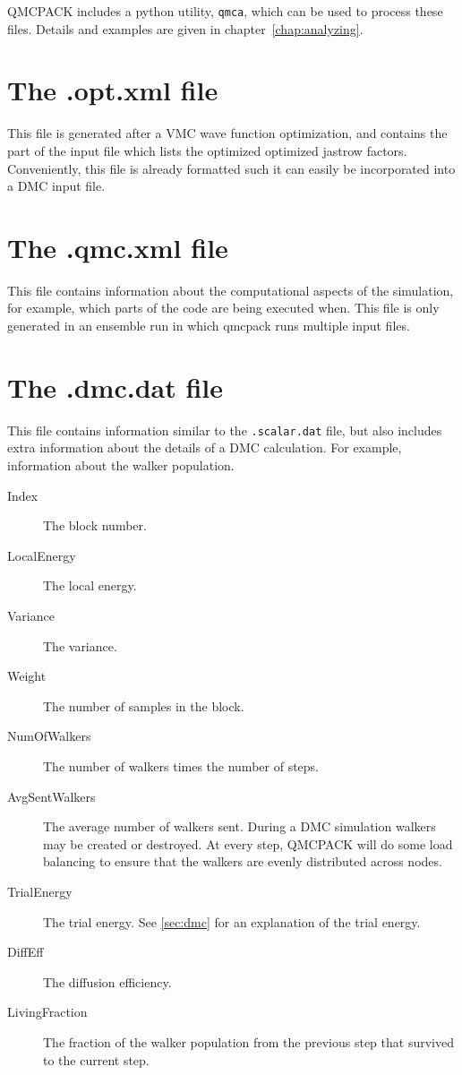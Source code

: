 QMCPACK includes a python utility, \texttt{qmca}, which can be used to process these files. Details and examples are given in chapter~\ref{chap:analyzing}.
\section{The .opt.xml file}
\label{sec:optxml_file}
This file is generated after a VMC wave function optimization, and contains the part of the input file which lists the optimized optimized jastrow factors.
Conveniently, this file is already formatted such it can easily be incorporated into a DMC input file.

\section{The .qmc.xml file}
\label{sec:qmc_file}
This file contains information about the computational aspects of the simulation, for example, which parts of the code are being executed when. This file is only generated in an ensemble run in which qmcpack runs multiple input files.

\section{The .dmc.dat file}
\label{sec:dmc_file}
This file contains information similar to the \texttt{.scalar.dat} file, but also includes extra information about the details of a DMC calculation. For example, information about the walker population.

\begin{description}
\item[Index] The block number.
\item[LocalEnergy] The local energy.
\item[Variance] The variance.
\item[Weight] The number of samples in the block.
\item[NumOfWalkers] The number of walkers times the number of steps.
\item[AvgSentWalkers] The average number of walkers sent. During a DMC simulation walkers may be created or destroyed. At every step, QMCPACK will do some load balancing to ensure that the walkers are evenly distributed across nodes.
\item[TrialEnergy] The trial energy. See \ref{sec:dmc} for an explanation of the trial energy.
\item[DiffEff] The diffusion efficiency.
\item[LivingFraction] The fraction of the walker population from the previous step that survived to the current step.
\end{description}


